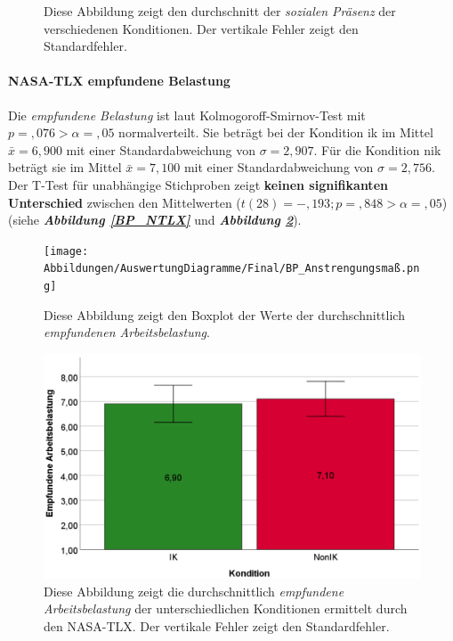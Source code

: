 \documentclass[a4paper,11pt]{article}%
\renewcommand{\\}{\vspace*{0.5\baselineskip} \newline}
\begin{document}
{\begin{figure}[H]
\begin{minipage}[t]{.5\linewidth}
      \caption[Durchschnittliche soziale Präsenz]{Diese Abbildung zeigt den durchschnitt der \textit{sozialen Präsenz} der verschiedenen Konditionen. Der vertikale Fehler zeigt den Standardfehler.}
       \label{SD_SocialPresence_Mittelwerte}
   \end{minipage}
\end{figure}

\newpage

\paragraph{NASA-TLX \glqq{}empfundene Belastung\dq{}}
\label{NASA-TLX}
Die \textit{empfundene Belastung} ist laut  Kolmogoroff-Smirnov-Test mit $p =,076 > \alpha = ,05$ normalverteilt. 
Sie beträgt bei der Kondition \ac{ik} im Mittel $\bar{x} = 6,900$ mit einer Standardabweichung von $\sigma = 2,907$.
Für die Kondition \ac{nik} beträgt sie im Mittel $\bar{x} = 7,100$ mit einer Standardabweichung von $\sigma = 2,756$. 
Der T-Test für unabhängige Stichproben zeigt \textbf{keinen signifikanten Unterschied} zwischen den Mittelwerten ($t(28) = -,193; p =,848 > \alpha = ,05$) (siehe \textbf{\textit{Abbildung \ref{BP_NTLX}}} und \textbf{\textit{Abbildung \ref{SD_NTLX_Mittelwerte}}}).

	\begin{figure}[H]
   \begin{minipage}[t]{.5\linewidth} %
      \texttt{[image: Abbildungen/AuswertungDiagramme/Final/BP\_Anstrengungsmaß.png]}
      \caption[Boxplot der empfundenen Arbeitsbelastung]{Diese Abbildung zeigt den Boxplot der Werte der durchschnittlich \textit{empfundenen Arbeitsbelastung}.}
            \label{BP_NTLX}
   \end{minipage}
   \hspace{.02\linewidth}%
   \begin{minipage}[t]{.5\linewidth} %
     \includegraphics[width=\linewidth]{Abbildungen/AuswertungDiagramme/Final/SD_NTLX_Mittelwerte.png}
      \caption[Durchschnittlich empfundene Arbeitsbelastung]{Diese Abbildung zeigt die durchschnittlich \textit{empfundene Arbeitsbelastung} der unterschiedlichen Konditionen ermittelt durch den NASA-TLX. Der vertikale Fehler zeigt den Standardfehler.}
       \label{SD_NTLX_Mittelwerte}
   \end{minipage}
\end{figure}

}
\end{document}
